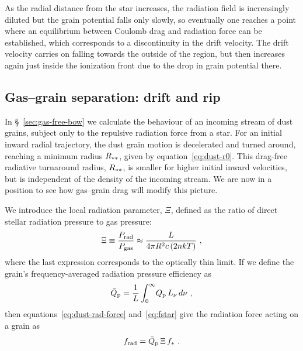 As the radial distance from the star increases, the radiation field is
increasingly diluted but the grain potential falls only slowly, so
eventually one reaches a point where an equilibrium between Coulomb
drag and radiation force can be established, which corresponds to a
discontinuity in the drift velocity.  The drift velocity carries
on falling towards the outside of the \hii{} region, but then
increases again just inside the ionization front due to the drop in
grain potential there.

\subsection{Gas--grain separation: drift and rip}
\label{sec:gas-grain-separ}

In \S~\ref{sec:gas-free-bow} we calculate the behaviour of an
incoming stream of dust grains, subject only to the repulsive
radiation force from a star.  For an initial inward radial trajectory,
the dust grain motion is decelerated and turned around, reaching a
minimum radius \(R_{**}\), given by equation~\eqref{eq:dust-r0}.
This drag-free radiative turnaround radius, \(R_{**}\), is smaller
for higher initial inward velocities, but is independent of the
density of the incoming stream.  We are now in a position to see how
gas--grain drag will modify this picture.

We introduce the local radiation parameter, \(\Xi\), defined as the
ratio of direct stellar radiation pressure to gas pressure:
\begin{equation}
  \label{eq:Xi-Prad-over-Pgas}
  \Xi \equiv \frac{P_{\text{rad}}}{P_{\text{gas}}} \approx \frac{L}{4 \pi R^2 c\, (2 n k T)} \ ,
\end{equation}
where the last expression corresponds to the optically thin limit.  If
we define the grain's frequency-averaged radiation pressure efficiency
as
\begin{equation}
  \label{eq:Qpbar}
  \bar{Q}_{\text{p}} = \frac{1}{L} \int_0^\infty \!Q_{\text{p}} \, L_\nu \, d\nu \ ,
\end{equation}
then equations~\eqref{eq:dust-rad-force} and~\eqref{eq:fstar} give the
radiation force acting on a grain as
\begin{equation}
  \label{eq:frad-Xi}
  f_{\text{rad}} = \bar{Q}_{\text{p}}\, \Xi\, f_* \ .
\end{equation}

